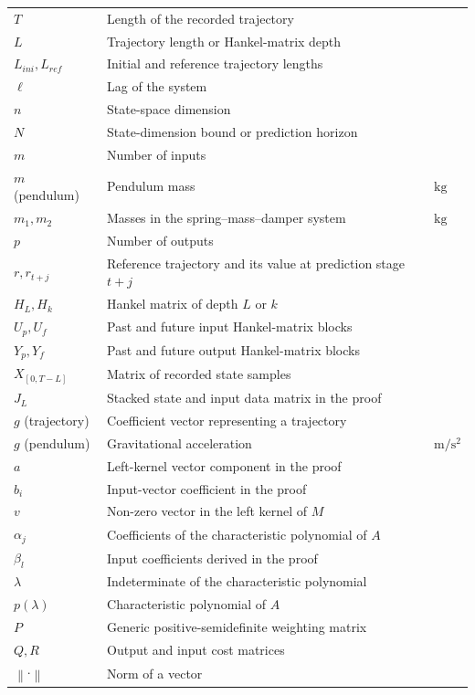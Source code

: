 \documentclass[12pt,a4paper]{report}
\newcommand{\norm}[1]{\left\lVert #1 \right\rVert}
\begin{document}
\begin{longtable}{@{}p{}p{}p{}@{}}
$T$ & Length of the recorded trajectory & \\
$L$ & Trajectory length or Hankel-matrix depth & \\
$L_{ini}, L_{ref}$ & Initial and reference trajectory lengths & \\
$\ell$ & Lag of the system & \\
$n$ & State-space dimension & \\
$N$ & State-dimension bound or prediction horizon & \\
$m$ & Number of inputs & \\
$m$ (pendulum) & Pendulum mass & $\mathrm{kg}$ \\
$m_1, m_2$ & Masses in the spring--mass--damper system & $\mathrm{kg}$ \\
$p$ & Number of outputs & \\
$r, r_{t+j}$ & Reference trajectory and its value at prediction stage $t+j$ & \\
$H_L, H_k$ & Hankel matrix of depth $L$ or $k$ & \\
$U_p, U_f$ & Past and future input Hankel-matrix blocks & \\
$Y_p, Y_f$ & Past and future output Hankel-matrix blocks & \\
$X_{[0,T-L]}$ & Matrix of recorded state samples & \\
$J_L$ & Stacked state and input data matrix in the proof & \\
$g$ (trajectory) & Coefficient vector representing a trajectory & \\
$g$ (pendulum) & Gravitational acceleration & $\mathrm{m/s^2}$ \\
$a$ & Left-kernel vector component in the proof & \\
$b_i$ & Input-vector coefficient in the proof & \\
$v$ & Non-zero vector in the left kernel of $M$ & \\
$\alpha_j$ & Coefficients of the characteristic polynomial of $A$ & \\
$\beta_l$ & Input coefficients derived in the proof & \\
$\lambda$ & Indeterminate of the characteristic polynomial & \\
$p(\lambda)$ & Characteristic polynomial of $A$ & \\
$P$ & Generic positive-semidefinite weighting matrix & \\
$Q, R$ & Output and input cost matrices & \\
$\norm{\cdot}$ & Norm of a vector & \\

\end{longtable}
\end{document}
